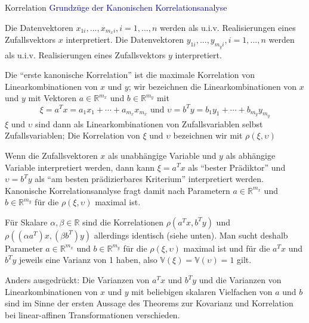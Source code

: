 \documentclass[
  8pt,
  ignorenonframetext,
]{beamer}
\begin{document}
\begin{frame}{Korrelation}
\protect\hypertarget{korrelation-13}{}
\textcolor{darkblue}{Grundzüge der Kanonischen Korrelationsanalyse}
\footnotesize

Die Datenvektoren \(x_{1i},...,x_{m_xi}, i = 1,...,n\) werden als u.i.v.
Realisierungen eines Zufallsvektors \(x\) interpretiert. Die
Datenvektoren \(y_{1i},...,y_{m_yi}, i = 1,...,n\) werden als u.i.v.
Realisierungen eines Zufallsvektors \(y\) interpretiert.

Die ``erste kanonische Korrelation'' ist die maximale Korrelation von
Linearkombinationen von \(x\) und \(y\); wir bezeichnen die
Linearkombinationen von \(x\) und \(y\) mit Vektoren
\(a \in \mathbb{R}^{m_x}\) und \(b \in \mathbb{R}^{m_y}\) mit
\begin{equation}
\xi      = a^Tx = a_1x_1 + \cdots + a_{m_x}x_{m_x}
\mbox{ und }
\upsilon = b^Ty = b_1y_1 + \cdots + b_{m_y}y_{m_y}
\end{equation} \(\xi\) und \(\upsilon\) sind dann als
Linearkombinationen von Zufallsvariablen selbst Zufallsvariablen; Die
Korrelation von \(\xi\) und \(\upsilon\) bezeichnen wir mit
\(\rho(\xi,\upsilon)\)

Wenn die Zufallsvektoren \(x\) als unabhängige Variable und \(y\) als
abhängige Variable interpretiert werden, dann kann \(\xi= a^Tx\) als
``bester Prädiktor'' und \(\upsilon = b^Ty\) als ``am besten
prädizierbares Kriterium'' interpretiert werden. Kanonische
Korrelationsanalyse fragt damit nach Parametern
\(a \in \mathbb{R}^{m_x}\) und \(b\in \mathbb{R}^{m_y}\) für die
\(\rho(\xi,\upsilon)\) maximal ist.

Für Skalare \(\alpha,\beta\in \mathbb{R}\) sind die Korrelationen
\(\rho(a^Tx,b^Ty)\) und \(\rho((\alpha a^T)x,(\beta b^T)y)\) allerdings
identisch (siehe unten). Man sucht deshalb Parameter
\(a \in \mathbb{R}^{m_x}\) und \(b\in \mathbb{R}^{m_y}\) für die
\(\rho(\xi,\upsilon)\) maximal ist und für die \(a^Tx\) und \(b^Ty\)
jeweils eine Varianz von 1 haben, also
\(\mathbb{V}(\xi) = \mathbb{V}(\upsilon) = 1\) gilt.

Anders ausgedrückt: Die Varianzen von \(a^Tx\) und \(b^Ty\) und die
Varianzen von Linearkombinationen von \(x\) und \(y\) mit beliebigen
skalaren Vielfachen von \(a\) und \(b\) sind im Sinne der ersten Aussage
des Theorems zur Kovarianz und Korrelation bei linear-affinen
Transformationen verschieden.
\end{frame}
\end{document}
